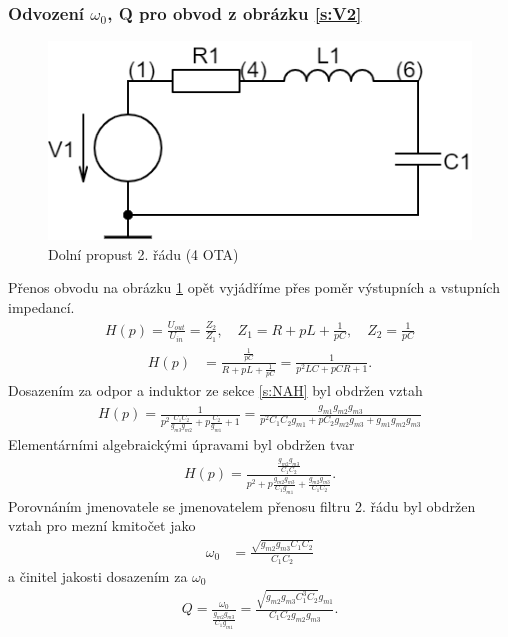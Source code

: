 \subsubsection{Odvození $\omega_0$, Q pro obvod z obrázku \ref{s:V2}}
\begin{figure}[h]
\centering
\includegraphics[scale=0.3]{Circuit(2).png}
\caption{Dolní propust 2. řádu (4 OTA) \label{s:RLC2}} 
\end{figure}
\noindent Přenos obvodu na obrázku \ref{s:RLC2} opět vyjádříme přes poměr výstupních a vstupních impedancí. 
\begin{align}
H(p) = \frac{U_{out}}{U_{in}} = \frac{Z_2}{Z_1}, \quad Z_1 = R + pL + \frac{1}{pC},\quad Z_2 = \frac{1}{pC}
\end{align}
\begin{align}
H(p) &= \frac{\frac{1}{pC}}{R + pL + \frac{1}{pC}} = \frac{1}{p^2LC + pCR + 1}.
\end{align}
\noindent Dosazením za odpor a induktor ze sekce \ref{s:NAH} byl obdržen vztah
\begin{align}
H(p) = \frac{1}{p^2\frac{C_1C_2}{g_{m3}g_{m2}} + p\frac{C_2}{g_{m1}} + 1} = \frac{g_{m1}g_{m2}g_{m3}}{p^2C_1C_2g_{m1} + pC_2g_{m2}g_{m3} + g_{m1}g_{m2}g_{m3}}
\end{align}
\noindent Elementárními algebraickými úpravami byl obdržen tvar
\begin{align}
H(p) = \frac{\frac{g_{m2}g_{m3}}{C_1C_2}}{p^2 + p\frac{g_{m2}g_{m3}}{C_1g_{m1}} + \frac{g_{m2}g_{m3}}{C_1C_2}}.
\end{align}
Porovnáním jmenovatele se jmenovatelem přenosu filtru 2. řádu byl obdržen vztah pro mezní kmitočet jako 
\begin{align}
\omega _0 &= \frac{\sqrt{g_{m2}g_{m3}C_1C_2}}{C_1C_2}
\end{align}
a činitel jakosti dosazením za $\omega _0$
\begin{align}
Q = \frac{\omega _0}{\frac{g_{m2}g_{m3}}{C_1g_{m1}}} = \frac{\sqrt{g_{m2}g_{m3}C_1^3C_2}g_{m1}}{C_1C_2g_{m2}g_{m3}}.
\end{align}